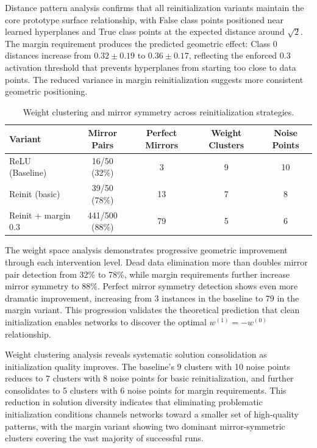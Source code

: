Distance pattern analysis confirms that all reinitialization variants maintain the core prototype surface relationship, with False class points positioned near learned hyperplanes and True class points at the expected distance around $\sqrt{2}$. The margin requirement produces the predicted geometric effect: Class 0 distances increase from $0.32 \pm 0.19$ to $0.36 \pm 0.17$, reflecting the enforced 0.3 activation threshold that prevents hyperplanes from starting too close to data points. The reduced variance in margin reinitialization suggests more consistent geometric positioning.

\begin{table}[ht]
\centering
\caption{Weight clustering and mirror symmetry across reinitialization strategies.}
\label{tab:relu1-reinit-symmetry}
\begin{tabular}{lcccc}
\toprule
Variant & Mirror Pairs & Perfect Mirrors & Weight Clusters & Noise Points \\
\midrule
ReLU (Baseline) & 16/50 (32\%) & 3 & 9 & 10 \\
Reinit (basic) & 39/50 (78\%) & 13 & 7 & 8 \\
Reinit + margin 0.3 & 441/500 (88\%) & 79 & 5 & 6 \\
\bottomrule
\end{tabular}
\end{table}

The weight space analysis demonstrates progressive geometric improvement through each intervention level. Dead data elimination more than doubles mirror pair detection from 32\% to 78\%, while margin requirements further increase mirror symmetry to 88\%. Perfect mirror symmetry detection shows even more dramatic improvement, increasing from 3 instances in the baseline to 79 in the margin variant. This progression validates the theoretical prediction that clean initialization enables networks to discover the optimal $w^{(1)} = -w^{(0)}$ relationship.

Weight clustering analysis reveals systematic solution consolidation as initialization quality improves. The baseline's 9 clusters with 10 noise points reduces to 7 clusters with 8 noise points for basic reinitialization, and further consolidates to 5 clusters with 6 noise points for margin requirements. This reduction in solution diversity indicates that eliminating problematic initialization conditions channels networks toward a smaller set of high-quality patterns, with the margin variant showing two dominant mirror-symmetric clusters covering the vast majority of successful runs.

